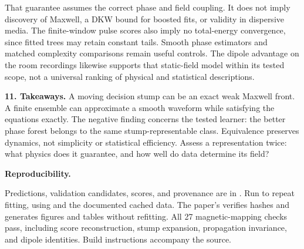\documentclass[11pt,letterpaper]{article}
\begin{document}
That guarantee assumes the correct phase and field coupling. It does not imply
discovery of Maxwell, a DKW bound for boosted fits, or validity in dispersive
media. The finite-window pulse scores also imply no total-energy convergence,
since fitted trees may retain constant tails. Smooth phase estimators and matched
complexity comparisons remain useful controls. The dipole advantage on the room
recordings likewise supports that static-field model within its tested scope,
not a universal ranking of physical and statistical descriptions.

\textbf{11. Takeaways.}
A moving decision stump can be an exact weak Maxwell front. A finite ensemble
can approximate a smooth waveform while satisfying the equations exactly.
The negative finding concerns the tested learner: the better phase forest
belongs to the same stump-representable class. Equivalence preserves dynamics,
not simplicity or statistical efficiency. Assess a representation twice:
what physics does it guarantee, and how well do data determine its field?

\textbf{Reproducibility.}
\begingroup\raggedright
Predictions, validation candidates, scores, and provenance are in
.
Run  to repeat fitting,
using  and the documented cached data.
The paper's  verifies hashes and generates figures
and tables without refitting. All 27 magnetic-mapping checks pass, including
score reconstruction, stump expansion, propagation invariance, and dipole
identities. Build instructions accompany the source.
\par\endgroup
\end{document}
